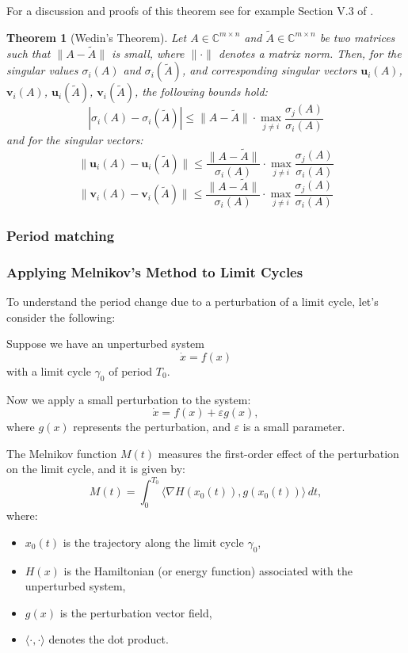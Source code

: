 \documentclass{article}
\newtheorem{theorem}{Theorem}
\theoremstyle{definition} \newtheorem{definition}{Definition}
\theoremstyle{remark} \newtheorem{remark}{Remark}
\newcounter{ct}
\begin{document}
For a discussion and proofs of this theorem see for example Section V.3 of \citet{stewart1990matrix}.


\begin{theorem}[Wedin's Theorem]
Let \( A \in \mathbb{C}^{m \times n} \) and \( \tilde{A} \in \mathbb{C}^{m \times n} \) be two matrices such that \( \| A - \tilde{A} \| \) is small, where \( \| \cdot \| \) denotes a matrix norm. Then, for the singular values \( \sigma_i(A) \) and \( \sigma_i(\tilde{A}) \), and corresponding singular vectors \( \mathbf{u}_i(A) \), \( \mathbf{v}_i(A) \), \( \mathbf{u}_i(\tilde{A}) \), \( \mathbf{v}_i(\tilde{A}) \), the following bounds hold:
\[
\left| \sigma_i(A) - \sigma_i(\tilde{A}) \right| \leq \| A - \tilde{A} \| \cdot \max_{j \neq i} \frac{\sigma_j(A)}{\sigma_i(A)}
\]
and for the singular vectors:
\[
\| \mathbf{u}_i(A) - \mathbf{u}_i(\tilde{A}) \| \leq \frac{\| A - \tilde{A} \|}{\sigma_i(A)} \cdot \max_{j \neq i} \frac{\sigma_j(A)}{\sigma_i(A)}
\]
\[
\| \mathbf{v}_i(A) - \mathbf{v}_i(\tilde{A}) \| \leq \frac{\| A - \tilde{A} \|}{\sigma_i(A)} \cdot \max_{j \neq i} \frac{\sigma_j(A)}{\sigma_i(A)}
\]
\end{theorem}



\subsubsection{Period matching}
\subsubsection{Applying Melnikov’s Method to Limit Cycles}

To understand the period change due to a perturbation of a limit cycle, let’s consider the following:

Suppose we have an unperturbed system
\[
\dot{x} = f(x)
\]
with a limit cycle \(\gamma_0\) of period \(T_0\).

Now we apply a small perturbation to the system:
\[
\dot{x} = f(x) + \varepsilon g(x),
\]
where \(g(x)\) represents the perturbation, and \(\varepsilon\) is a small parameter.

The Melnikov function \(M(t)\) measures the first-order effect of the perturbation on the limit cycle, and it is given by:
\[
M(t) = \int_0^{T_0} \langle \nabla H(x_0(t)), g(x_0(t)) \rangle \, dt,
\]
where:
\begin{itemize}
    \item \(x_0(t)\) is the trajectory along the limit cycle \(\gamma_0\),
    \item \(H(x)\) is the Hamiltonian (or energy function) associated with the unperturbed system,
    \item \(g(x)\) is the perturbation vector field,
    \item \(\langle \cdot, \cdot \rangle\) denotes the dot product.
\end{itemize}
\end{document}

